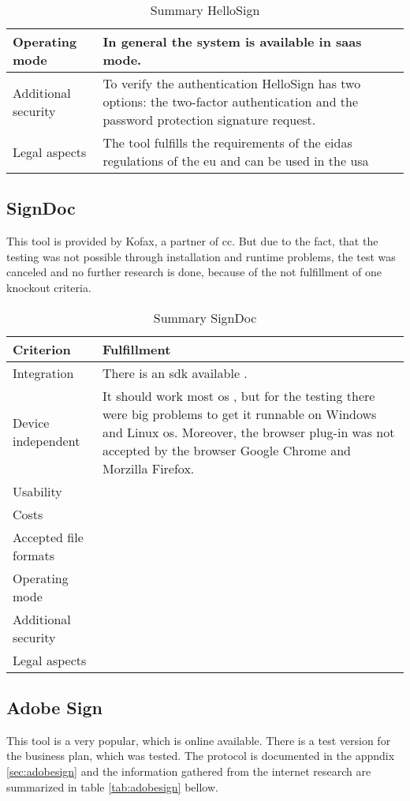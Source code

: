 \begin{table}[h!]
\begin{tabular}{|p{4cm}|p{10cm}|}
		Operating mode & In general the system is available in \gls{saas} mode. \parencite{hellosign2018features} \\ \hline
		Additional security & To verify the authentication HelloSign has two options: the two-factor authentication and the password protection signature request.\parencite{hellosign2018security} \\ \hline
		Legal aspects & The tool fulfills the requirements of the \gls{eidas} regulations of the \gls{eu} and can be used in the \gls{usa} \parencite{hellosign2018legal} \\ \hline
	\end{tabular}
	\caption{Summary HelloSign}
	\label{tab:hellosign}
\end{table}
\clearpage

\subsection{SignDoc}
This tool is provided by Kofax, a partner of \gls{cc}. But due to the fact, that the testing was not possible through installation and runtime problems, the test was canceled and no further research is done, because of the not fulfillment of one knockout criteria. 

\begin{table}[h!]
	\begin{tabular}{|p{4cm}|p{10cm}|} \hline
		Criterion & Fulfillment \\ \hline
		Integration & There is an \gls{sdk} available \parencite{kofax2018sdk}. \\ \hline
		Device independent & It should work most \gls{os} \parencite{kofax2018sdk}, but for the testing there were big problems to get it runnable on Windows and Linux \gls{os}. Moreover, the browser plug-in was not accepted by the browser Google Chrome and Morzilla Firefox. \\ \hline
		Usability & \\ \hline
		Costs & \\ \hline
		Accepted file formats & \\ \hline
		Operating mode & \\ \hline
		Additional security & \\ \hline
		Legal aspects & \\ \hline
	\end{tabular}
	\caption{Summary SignDoc}
	\label{tab:signdoc}
\end{table}

\subsection{Adobe Sign}
This tool is a very popular, which is online available. There is a test version for the business plan, which was tested. The protocol is documented in the appndix \ref{sec:adobesign} and the information gathered from the internet research are summarized in table \ref{tab:adobesign} bellow. 
	
